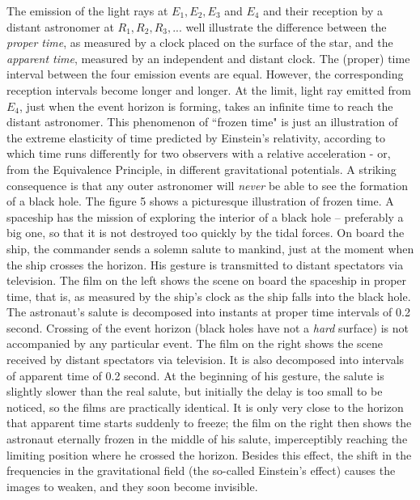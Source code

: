 \documentclass[12pt]{article}
\begin{document}
The emission of the light
rays at $E_1, E_2, E_3$ and $E_4$ and their reception by a distant astronomer
at $R_1, R_2, R_3, ...$ well illustrate the difference between the {\it proper
time}, as measured by a clock placed on the surface of the star, and the {\it
apparent time}, measured by an independent and distant clock. The (proper) time
interval between the four emission events are equal. However, the
corresponding reception intervals become longer and longer. At the limit,
light ray emitted from $E_4$, just when the event horizon is forming, takes an
infinite time to reach the distant astronomer. This phenomenon of ``frozen
time" is just an illustration of the extreme elasticity of time predicted by
Einstein's relativity, according to which time runs differently for two
observers with a relative acceleration - or, from the Equivalence Principle,
in different gravitational potentials. A striking consequence is that any
outer astronomer will {\it never} be able to see the formation of a black
hole. The figure 5 shows a picturesque illustration of frozen time. A
spaceship has the mission of exploring the interior of a black hole --
preferably a big one, so that it is not destroyed too quickly by the tidal
forces. On board the ship, the commander sends a solemn salute to mankind,
just at the moment when the ship crosses the horizon. His gesture is
transmitted to distant spectators via television. The film on the left shows
the scene on board the spaceship in proper time, that is, as measured by the
ship's clock as the ship falls into the black hole. The astronaut's salute
is decomposed into instants at proper time intervals of 0.2 second. Crossing of
the event horizon (black holes have not a {\it hard} surface)  is not
accompanied by any particular event. The film on the right shows the scene
received by distant spectators via television. It is also decomposed
into intervals of apparent time of 0.2 second. At the beginning of his
gesture, the salute is slightly slower than the real salute, but initially
the delay is too small to be noticed, so the films are practically
identical. It is only very close to the horizon that apparent time starts
suddenly to freeze;  the film on the right then shows the astronaut eternally
frozen in the middle of his salute, imperceptibly reaching the limiting
position where he crossed the horizon. Besides this effect, the shift in the
frequencies in the gravitational field  (the so-called Einstein's effect)
causes the images to weaken, and they soon become invisible.
\end{document}
